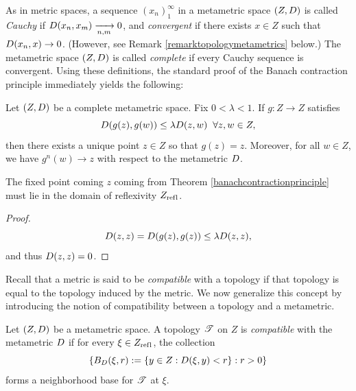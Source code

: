 As in metric spaces, a sequence $(x_n)_1^\infty$ in a metametric space $(Z,D)$ is called \emph{Cauchy} if $D(x_n,x_m)\xrightarrow[n,m]{} 0$, and \emph{convergent} if there exists $x\in Z$ such that $D(x_n,x)\to 0$. (However, see Remark \ref{remarktopologymetametrics} below.) The metametric space $(Z,D)$ is called \emph{complete} if every Cauchy sequence is convergent. Using these definitions, the standard proof of the Banach contraction principle immediately yields the following:

\begin{theorem}\label{banachcontractionprinciple}
Let $(Z,D)$ be a complete metametric space. Fix $0 < \lambda < 1$. If $g:Z\to Z$ satisfies
\[
D(g(z),g(w)) \leq \lambda D(z,w) \;\;\forall z,w\in Z,
\]
then there exists a unique point $z\in Z$ so that $g(z) = z$. Moreover, for all $w\in Z$, we have $g^n(w)\to z$ with respect to the metametric $D$.
\end{theorem}

\begin{observation}
The fixed point coming $z$ coming from Theorem \ref{banachcontractionprinciple} must lie in the domain of reflexivity $Z_{\mathrm{ref \hspace{0 in} l}}$.
\end{observation}
\begin{proof}
\[
D(z,z) = D(g(z),g(z)) \leq \lambda D(z,z),
\]
and thus $D(z,z) = 0$.
\end{proof}

Recall that a metric is said to be \emph{compatible} with a topology if that topology is equal to the topology induced by the metric. We now generalize this concept by introducing the notion of compatibility between a topology and a metametric.

\begin{definition}
\label{definitioncompatiblemetametric}
Let $(Z,D)$ be a metametric space. A topology $\mathscr T$ on $Z$ is \emph{compatible} with the metametric $D$ if for every $\xi\in Z_{\mathrm{ref \hspace{0 in} l}}$, the collection
\begin{equation}
\label{balls}
\left\{B_D(\xi,r) := \{y\in Z : D(\xi,y) < r\} : r > 0\right\}
\end{equation}
forms a neighborhood base for $\mathscr T$ at $\xi$.
\end{definition}

